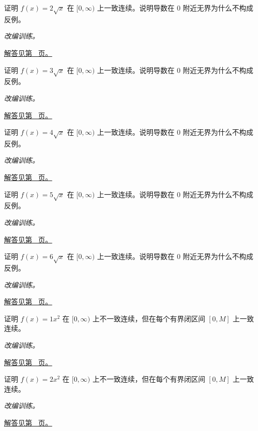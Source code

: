 \documentclass[UTF8,12pt,a4paper,fontset=fandol]{ctexart}
\begin{document}
\begin{example}[一致连续与无界导数]\label{ex:c6q14}
证明 $f(x)=2\sqrt x$ 在 $[0,\infty)$ 上一致连续。说明导数在 $0$ 附近无界为什么不构成反例。
\par\textit{改编训练。}\par\hyperref[ans:c6q14]{解答见第~\pageref{ans:c6q14} 页。}
\end{example}
\begin{example}[一致连续与无界导数]\label{ex:c6q15}
证明 $f(x)=3\sqrt x$ 在 $[0,\infty)$ 上一致连续。说明导数在 $0$ 附近无界为什么不构成反例。
\par\textit{改编训练。}\par\hyperref[ans:c6q15]{解答见第~\pageref{ans:c6q15} 页。}
\end{example}
\begin{example}[一致连续与无界导数]\label{ex:c6q16}
证明 $f(x)=4\sqrt x$ 在 $[0,\infty)$ 上一致连续。说明导数在 $0$ 附近无界为什么不构成反例。
\par\textit{改编训练。}\par\hyperref[ans:c6q16]{解答见第~\pageref{ans:c6q16} 页。}
\end{example}
\begin{example}[一致连续与无界导数]\label{ex:c6q17}
证明 $f(x)=5\sqrt x$ 在 $[0,\infty)$ 上一致连续。说明导数在 $0$ 附近无界为什么不构成反例。
\par\textit{改编训练。}\par\hyperref[ans:c6q17]{解答见第~\pageref{ans:c6q17} 页。}
\end{example}
\begin{example}[一致连续与无界导数]\label{ex:c6q18}
证明 $f(x)=6\sqrt x$ 在 $[0,\infty)$ 上一致连续。说明导数在 $0$ 附近无界为什么不构成反例。
\par\textit{改编训练。}\par\hyperref[ans:c6q18]{解答见第~\pageref{ans:c6q18} 页。}
\end{example}
\begin{example}[用点列否定一致连续]\label{ex:c6q19}
证明 $f(x)=1x^2$ 在 $[0,\infty)$ 上不一致连续，但在每个有界闭区间 $[0,M]$ 上一致连续。
\par\textit{改编训练。}\par\hyperref[ans:c6q19]{解答见第~\pageref{ans:c6q19} 页。}
\end{example}
\begin{example}[用点列否定一致连续]\label{ex:c6q20}
证明 $f(x)=2x^2$ 在 $[0,\infty)$ 上不一致连续，但在每个有界闭区间 $[0,M]$ 上一致连续。
\par\textit{改编训练。}\par\hyperref[ans:c6q20]{解答见第~\pageref{ans:c6q20} 页。}
\end{example}
\end{document}
